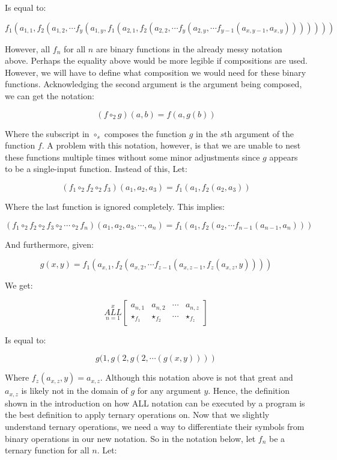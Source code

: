 \documentclass{article}
\begin{document}
Is equal to:

$$f_1(a_{1,1}, f_2(a_{1,2}, \cdots f_y (a_{1,y}, f_1(a_{2,1}, f_2 (a_{2,2}, \cdots f_y(a_{2,y}, \cdots f_{y-1}(a_{x,y-1},a_{x,y} ) ) ) ) ) ) )$$

However, all $f_n$ for all $n$ are binary functions in the already messy notation above. Perhaps the equality above would be more legible if compositions are used. However, we will have to define what composition we would need for these binary functions. Acknowledging the second argument is the argument being composed, we can get the notation:

$$(f \circ_2 g)(a,b)=f(a,g(b))$$

Where the subscript in $\circ_s$ composes the function $g$ in the $s$th argument of the function $f$. A problem with this notation, however, is that we are unable to nest these functions multiple times without some minor adjustments since $g$ appears to be a single-input function. Instead of this, Let:

$$(f_1 \circ_2 f_2 \circ_2 f_3)(a_1,a_2,a_3)=f_1(a_1,f_2(a_2,a_3))$$

Where the last function is ignored completely. This implies:

 $$(f_1 \circ_2 f_2 \circ_2 f_3 \circ_2 \cdots \circ_2 f_n)(a_1,a_2,a_3,\cdots,a_n)=f_1(a_1,f_2(a_2,\cdots f_{n-1}(a_{n-1},a_n)))$$

And furthermore, given:

$$g(x,y)=f_1(a_{x,1},f_2(a_{x,2},\cdots f_{z-1}(a_{x,z-1},f_{z}(a_{x,z},y))))$$

We get:

$$\underset{n=1}{\overset{x}{ALL}} \begin{bmatrix}
a_{n,1} & a_{n,2} & \cdots & a_{n,z} \\
\star_{f_1} & \star_{f_2} & \cdots & \star_{f_z}
\end{bmatrix}$$

Is equal to:

$$g(1,g(2,g(2,\cdots(g(x,y))))$$

Where $f_{z}(a_{x,z},y)=a_{x,z}$. Although this notation above is not that great and $a_{x,z}$ is likely not in the domain of $g$ for any argument $y$. Hence, the definition shown in the introduction on how ALL notation can be executed by a program is the best definition to apply ternary operations on. Now that we slightly understand ternary operations, we need a way to differentiate their symbols from binary operations in our new notation. So in the notation below, let $f_n$ be a ternary function for all $n$. Let:
\end{document}
